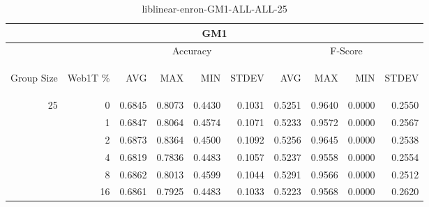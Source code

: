 \begin{center}
\begin{table}[htbp]
\begin{tabular}{ | r | r | r | r | r | r | r | r | r | r |}
\hline
\multicolumn{10}{|c|}{GM1}\\
\hline
 & & \multicolumn{4}{|c|}{Accuracy} & \multicolumn{4}{|c|}{F-Score}\\ \cline{3-10}
\begin{sideways}Group Size\end{sideways} & \begin{sideways}Web1T \%\end{sideways} & \begin{sideways}AVG\end{sideways} & \begin{sideways}MAX\end{sideways} & \begin{sideways}MIN\end{sideways} & \begin{sideways}STDEV\end{sideways} & \begin{sideways}AVG\end{sideways} & \begin{sideways}MAX\end{sideways} & \begin{sideways}MIN\end{sideways} & \begin{sideways}STDEV\end{sideways}\\
\hline
\multirow{6}{*}{25}
 & 0 & 0.6845 & 0.8073 & 0.4430 & 0.1031 & 0.5251 & 0.9640 & 0.0000 & 0.2550\\ \cline{2-10}
 & 1 & 0.6847 & 0.8064 & 0.4574 & 0.1071 & 0.5233 & 0.9572 & 0.0000 & 0.2567\\ \cline{2-10}
 & 2 & 0.6873 & 0.8364 & 0.4500 & 0.1092 & 0.5256 & 0.9645 & 0.0000 & 0.2538\\ \cline{2-10}
 & 4 & 0.6819 & 0.7836 & 0.4483 & 0.1057 & 0.5237 & 0.9558 & 0.0000 & 0.2554\\ \cline{2-10}
 & 8 & 0.6862 & 0.8013 & 0.4599 & 0.1044 & 0.5291 & 0.9566 & 0.0000 & 0.2512\\ \cline{2-10}
 & 16 & 0.6861 & 0.7925 & 0.4483 & 0.1033 & 0.5223 & 0.9568 & 0.0000 & 0.2620\\ \cline{2-10}
\hline
\end{tabular}
\caption{liblinear-enron-GM1-ALL-ALL-25}
\end{table}
\end{center}

